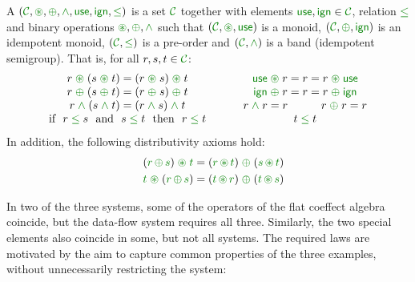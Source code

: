 \begin{definition}
A \emph{} $(\C, \cseq, \cpar, \czip, \cunit, \czero, \cleq)$ is a set 
$\C$ together with elements $\cunit, \czero \in \C$, relation $\cleq$ and binary operations 
$\cseq, \cpar, \czip$ such that $(\C, \cseq, \cunit)$ is a monoid, $(\C, \cpar, \czero)$ is an
idempotent monoid, $(\C, \cleq)$ is a pre-order and $(\C, \czip)$ is a band (idempotent semigroup). 
That is, for all $r,s,t\in \C$: 
%
\begin{equation*}
\begin{array}{ccc}
r \;\cseq\; (s \;\cseq\; t) = (r \;\cseq\; s) \;\cseq\; t &&
\cunit \;\cseq\; r = r = r \;\cseq\; \cunit 
\\
r \;\cpar\; (s \;\cpar\; t) = (r \;\cpar\; s) \;\cpar\; t &&
\czero \;\cpar\; r = r = r \;\cpar\; \czero 
\\
r \;\czip\; (s \;\czip\; t) = (r \;\czip\; s) \;\czip\; t &&
r\; \czip\; r = r \qquad\quad
r\; \cpar\; r = r 
\\
\textnormal{if}~~r\; \cleq\; s ~~\textnormal{and}~~s\; \cleq\; t~~\textnormal{then}~~r\; \cleq\; t &~~~~&
t\; \cleq\; t 
\end{array}
\end{equation*}
%
In addition, the following distributivity axioms hold:
\begin{align*}
\quad (\cclrd{r}\, \cpar\, \cclrd{s}) \;\cseq\; \cclrd{t} & = (\cclrd{r} \,\cseq\, \cclrd{t}) \;\cpar\; (\cclrd{s}\, \cseq\, \cclrd{t}) \\
\quad \cclrd{t} \;\cseq\; (\cclrd{r}\, \cpar\, \cclrd{s}) & = (\cclrd{t} \,\cseq\, \cclrd{r}) \;\cpar\; (\cclrd{t}\, \cseq\, \cclrd{s})
\end{align*}
\end{definition}

\noindent
In two of the three systems, some of the operators of the flat coeffect algebra coincide,
but the data-flow system requires all three. Similarly, the two special elements also 
coincide in some, but not all systems. The required laws are motivated by the aim to capture
common properties of the three examples, without unnecessarily restricting the system:


